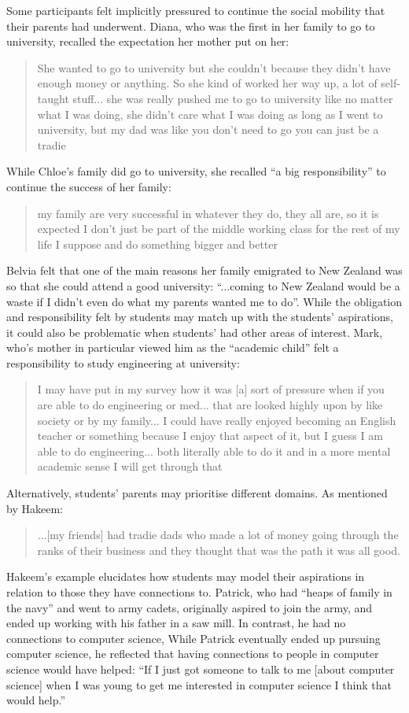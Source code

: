 Some participants felt implicitly pressured to continue the social mobility that their parents had underwent. Diana, who was the first in her family to go to university, recalled the expectation her mother put on her: \blockquote{She wanted to go to university but she couldn't because they didn't have enough money or anything. So she kind of worked her way up, a lot of self-taught stuff... she was really pushed me to go to university like no matter what I was doing, she didn't care what I was doing as long as I went to university, but my dad was like you don’t need to go you can just be a tradie}. While Chloe's family did go to university, she recalled ``a big responsibility'' to continue the success of her family: \blockquote{my family are very successful in whatever they do, they all are, so it is expected I don't just be part of the middle working class for the rest of my life I suppose and do something bigger and better}. Belvia felt that one of the main reasons her family emigrated to New Zealand was so that she could attend a good university: ``...coming to New Zealand would be a waste if I didn't even do what my parents wanted me to do''. While the obligation and responsibility felt by students may match up with the students' aspirations, it could also be problematic when students' had other areas of interest. Mark, who's mother in particular viewed him as the ``academic child'' felt a responsibility to study engineering at university: \blockquote{I may have put in my survey how it was [a] sort of pressure when if you are able to do engineering or med... that are looked highly upon by like society or by my family... I could have really enjoyed becoming an English teacher or something because I enjoy that aspect of it, but I guess I am able to do engineering... both literally able to do it and in a more mental academic sense I will get through that}. 

Alternatively, students' parents may prioritise different domains. As mentioned by Hakeem: \blockquote{...[my friends] had tradie dads who made a lot of money going through the ranks of their business and they thought that was the path it was all good.} Hakeem's example elucidates how students may model their aspirations in relation to those they have connections to. Patrick, who had ``heaps of family in the navy'' and went to army cadets, originally aspired to join the army, and ended up working with his father in a saw mill. In contrast, he had no connections to computer science, While Patrick eventually ended up pursuing computer science, he reflected that having connections to people in computer science would have helped:  ``If I just got someone to talk to me [about computer science] when I was young to get me interested in computer science I think that would help.'' 

